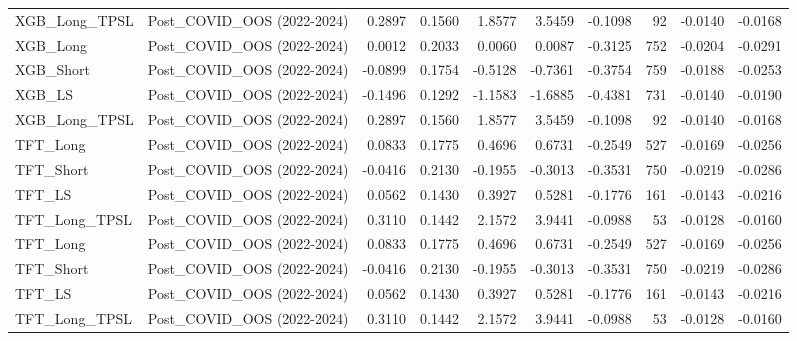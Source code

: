 \begin{tabular}{llrrrrrrrr}
XGB\_Long\_TPSL & Post\_COVID\_OOS (2022-2024) & 0.2897 & 0.1560 & 1.8577 & 3.5459 & -0.1098 & 92 & -0.0140 & -0.0168 \\
\cline{1-10}
XGB\_Long & Post\_COVID\_OOS (2022-2024) & 0.0012 & 0.2033 & 0.0060 & 0.0087 & -0.3125 & 752 & -0.0204 & -0.0291 \\
\cline{1-10}
XGB\_Short & Post\_COVID\_OOS (2022-2024) & -0.0899 & 0.1754 & -0.5128 & -0.7361 & -0.3754 & 759 & -0.0188 & -0.0253 \\
\cline{1-10}
XGB\_LS & Post\_COVID\_OOS (2022-2024) & -0.1496 & 0.1292 & -1.1583 & -1.6885 & -0.4381 & 731 & -0.0140 & -0.0190 \\
\cline{1-10}
XGB\_Long\_TPSL & Post\_COVID\_OOS (2022-2024) & 0.2897 & 0.1560 & 1.8577 & 3.5459 & -0.1098 & 92 & -0.0140 & -0.0168 \\
\cline{1-10}
TFT\_Long & Post\_COVID\_OOS (2022-2024) & 0.0833 & 0.1775 & 0.4696 & 0.6731 & -0.2549 & 527 & -0.0169 & -0.0256 \\
\cline{1-10}
TFT\_Short & Post\_COVID\_OOS (2022-2024) & -0.0416 & 0.2130 & -0.1955 & -0.3013 & -0.3531 & 750 & -0.0219 & -0.0286 \\
\cline{1-10}
TFT\_LS & Post\_COVID\_OOS (2022-2024) & 0.0562 & 0.1430 & 0.3927 & 0.5281 & -0.1776 & 161 & -0.0143 & -0.0216 \\
\cline{1-10}
TFT\_Long\_TPSL & Post\_COVID\_OOS (2022-2024) & 0.3110 & 0.1442 & 2.1572 & 3.9441 & -0.0988 & 53 & -0.0128 & -0.0160 \\
\cline{1-10}
TFT\_Long & Post\_COVID\_OOS (2022-2024) & 0.0833 & 0.1775 & 0.4696 & 0.6731 & -0.2549 & 527 & -0.0169 & -0.0256 \\
\cline{1-10}
TFT\_Short & Post\_COVID\_OOS (2022-2024) & -0.0416 & 0.2130 & -0.1955 & -0.3013 & -0.3531 & 750 & -0.0219 & -0.0286 \\
\cline{1-10}
TFT\_LS & Post\_COVID\_OOS (2022-2024) & 0.0562 & 0.1430 & 0.3927 & 0.5281 & -0.1776 & 161 & -0.0143 & -0.0216 \\
\cline{1-10}
TFT\_Long\_TPSL & Post\_COVID\_OOS (2022-2024) & 0.3110 & 0.1442 & 2.1572 & 3.9441 & -0.0988 & 53 & -0.0128 & -0.0160 \\
\cline{1-10}
\bottomrule
\end{tabular}
